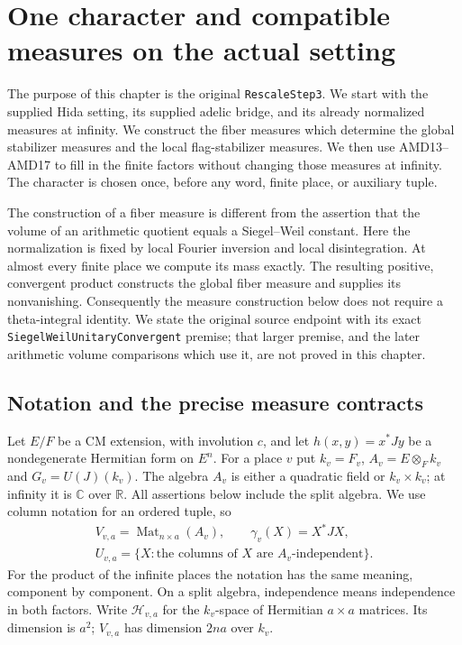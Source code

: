 \section{One character and compatible measures on the actual setting}
\label{sec:global-measure-rescaling-v53}

The purpose of this chapter is the original \texttt{RescaleStep3}.
We start with the supplied Hida setting, its supplied adelic bridge, and
its already normalized measures at infinity.  We construct the fiber
measures which determine the global stabilizer measures and the local
flag-stabilizer measures.  We then use AMD13--AMD17 to fill in the finite
factors without changing those measures at infinity.  The character is
chosen once, before any word, finite place, or auxiliary tuple.

The construction of a fiber measure is different from the assertion
that the volume of an arithmetic quotient equals a Siegel--Weil
constant.  Here the normalization is fixed by local Fourier inversion
and local disintegration.  At almost every finite place we compute its
mass exactly.  The resulting positive, convergent product constructs the
global fiber measure and supplies its nonvanishing.  Consequently the
measure construction below does not require a theta-integral identity.
We state the original source endpoint with its exact
\texttt{SiegelWeilUnitaryConvergent} premise; that larger premise, and the
later arithmetic volume comparisons which use it, are not proved in this
chapter.

\subsection{Notation and the precise measure contracts}

Let $E/F$ be a CM extension, with involution $c$, and let
$h(x,y)=x^*Jy$ be a nondegenerate Hermitian form on $E^n$.
For a place $v$ put $k_v=F_v$, $A_v=E\otimes_F k_v$ and
$G_v=U(J)(k_v)$.  The algebra $A_v$ is either a quadratic field or
$k_v\times k_v$; at infinity it is $\mathbb C$ over $\mathbb R$.
All assertions below include the split algebra.  We use column notation
for an ordered tuple, so
\[
 \begin{gathered}
 V_{v,a}=\operatorname{Mat}_{n\times a}(A_v),\qquad
 \gamma_v(X)=X^*JX,\\
 U_{v,a}=\{X:\text{the columns of }X\text{ are }A_v\text{-independent}\}.
 \end{gathered}
 \tag{GMR.1}
\]
For the product of the infinite places the notation has the same
meaning, component by component.  On a split algebra, independence
means independence in both factors.  Write $\mathcal H_{v,a}$ for the
$k_v$-space of Hermitian $a\times a$ matrices.  Its dimension is $a^2$;
$V_{v,a}$ has dimension $2na$ over $k_v$.

